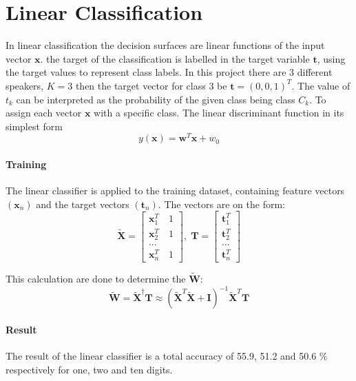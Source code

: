 \section*{Linear Classification}
In linear classification the decision surfaces are linear functions of the input vector $\mathbf{x}$.
the target of the classification is labelled in the target variable $\mathbf{t}$, using the target values to represent class labels.
In this project there are 3 different speakers, $K = 3$ then the target vector for class 3 be $\mathbf{t} = (0, 0, 1)^T$.
The value of $t_k$ can be interpreted as the probability of the given class being class $C_k$.
To assign each vector $\mathbf{x}$ with a specific class.
The linear discriminant function in its simplest form
\begin{equation}
y(\mathbf{x}) = \mathbf{w}^T \mathbf{x}+w_0
\label{eq:lin_output}
\end{equation}

\paragraph*{Training}
The linear classifier is applied to the training dataset, containing feature vectors $(\mathbf{x}_n)$ and the target vectors $(\mathbf{t}_n)$.
The vectors are on the form:
\begin{equation}
\mathbf{\tilde{X}}=\left[ \begin{array}{c}\mathbf{x}_1^T \quad 1\\
\mathbf{x}_2^T \quad 1\\
...\\ 
\mathbf{x}_n^T \quad 1 \end{array} \right],
\;
\mathbf{T}=\left[ \begin{array}{c}
\mathbf{t}_1^T\\ 
\mathbf{t}_2^T\\ 
...\\
\mathbf{t}_n^T
\end{array} \right]
\label{eq:linearVectors}  
\end{equation} 

This calculation are done to determine the $\tilde{\mathbf{W}}$:
\begin{equation}
\tilde{\mathbf{W}} = \tilde{\mathbf{X}}^\dagger \mathbf{T} \approx  (\tilde{\mathbf{X}}^T \tilde{\mathbf{X}}+\mathbf{I})^{-1} \tilde{\mathbf{X}}^T\mathbf{T}
\label{eq:weightVector}  
\end{equation}

\paragraph*{Result}
The result of the linear classifier is a total accuracy of 55.9, 51.2 and 50.6 \% respectively for one, two and ten digits. 
